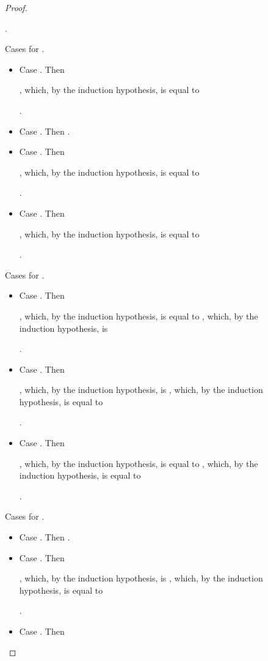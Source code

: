 \documentclass{LMCS}
\begin{document}
\begin{figure}
{\begin{proof}
\begin{myenumerate}
\begin{itemize}
	  .
      \end{itemize}
    \item Cases for .
      \begin{itemize}
	\item Case . Then 
	  
	  ,
	  which, by the induction hypothesis, is equal to
	  
	  .

	\item Case . Then .
	\item Case . Then 
	  
	  ,
	  which, by the induction hypothesis, is equal to
	  
	  .

	\item Case . Then 
	  
	  ,
	  which, by the induction hypothesis, is equal to
	  
	  .
      \end{itemize}
    \item Cases for .
      \begin{itemize}
	\item Case . Then 
	  
	  ,
	  which, by the induction hypothesis, is equal to
	  ,
	  which, by the induction hypothesis, is 
	  
	  .

	\item Case . Then
	  
	  ,
	  which, by the induction hypothesis, is 
	  ,
	  which, by the induction hypothesis, is equal to
	  
	  .

	\item Case . Then 
	  
	  ,
	  which, by the induction hypothesis, is equal to
	  ,
	  which, by the induction hypothesis, is equal to
	  
	  .
      \end{itemize}
    \item Cases for .
      \begin{itemize}
	\item Case . Then .
	\item Case . Then 
	  
	  ,
	  which, by the induction hypothesis, is 
	  ,
	  which, by the induction hypothesis, is equal to
	  
	  .

	\item Case . Then
	  

\end{itemize}
\end{myenumerate}
\end{proof}}
\end{figure}
\end{document}
